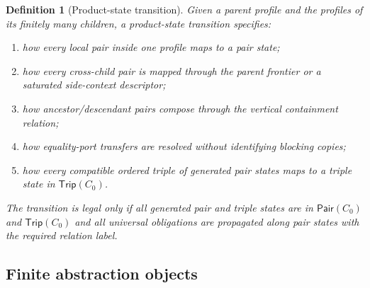 \documentclass[11pt]{article}
\newtheorem{definition}[theorem]{Definition}
\newcommand{\Pair}{\mathsf{Pair}}
\newcommand{\Trip}{\mathsf{Trip}}
\begin{document}
\begin{definition}[Product-state transition]
Given a parent profile and the profiles of its finitely many children, a product-state transition specifies:
\begin{enumerate}[label=(PS\arabic*)]
\item how every local pair inside one profile maps to a pair state;
\item how every cross-child pair is mapped through the parent frontier or a saturated side-context descriptor;
\item how ancestor/descendant pairs compose through the vertical containment relation;
\item how equality-port transfers are resolved without identifying blocking copies;
\item how every compatible ordered triple of generated pair states maps to a triple state in $\Trip(C_0)$.
\end{enumerate}
The transition is legal only if all generated pair and triple states are in $\Pair(C_0)$ and $\Trip(C_0)$ and all universal obligations are propagated along pair states with the required relation label.
\end{definition}

\subsection{Finite abstraction objects}
\end{document}
